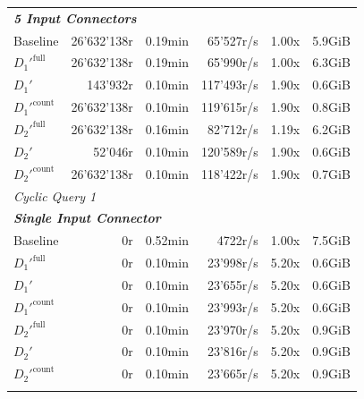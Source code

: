\begin{longtable}{lrrrrr}
    \multicolumn{6}{l}{\textit{\textbf{5 Input Connectors}}} \\
    \nopagebreak
    Baseline              &  26'632'138r          &  0.19min        &  65'527r/s           & 1.00x             & 5.9GiB    \\
    $D_1'^{\text{full}}$   &  26'632'138r          &  0.19min        &  65'990r/s           & 1.00x             & 6.3GiB    \\
    \quad $D_1'$           &  143'932r             &  0.10min        &  117'493r/s          & 1.90x             & 0.6GiB    \\
    $D_1'^{\text{count}}$  &  26'632'138r          &  0.10min        &  119'615r/s          & 1.90x             & 0.8GiB    \\
    $D_2'^{\text{full}}$   &  26'632'138r          &  0.16min        &  82'712r/s           & 1.19x             & 6.2GiB    \\
    \quad $D_2'$           &  52'046r              &  0.10min        &  120'589r/s          & 1.90x             & 0.6GiB    \\
    $D_2'^{\text{count}}$  &  26'632'138r          &  0.10min        &  118'422r/s          & 1.90x             & 0.7GiB    \\
    \midrule

    \multicolumn{6}{l}{\textit{Cyclic Query 1}} \\
    \midrule
    \multicolumn{6}{l}{\textit{\textbf{Single Input Connector}}} \\
    \nopagebreak
    Baseline              &  0r                   &  0.52min        &  4722r/s             & 1.00x             & 7.5GiB    \\
    $D_1'^{\text{full}}$   &  0r                   &  0.10min        &  23'998r/s           & 5.20x             & 0.6GiB    \\
    \quad $D_1'$           &  0r                   &  0.10min        &  23'655r/s           & 5.20x             & 0.6GiB    \\
    $D_1'^{\text{count}}$  &  0r                   &  0.10min        &  23'993r/s           & 5.20x             & 0.6GiB    \\
    $D_2'^{\text{full}}$   &  0r                   &  0.10min        &  23'970r/s           & 5.20x             & 0.9GiB    \\
    \quad $D_2'$           &  0r                   &  0.10min        &  23'816r/s           & 5.20x             & 0.9GiB    \\
    $D_2'^{\text{count}}$  &  0r                   &  0.10min        &  23'665r/s           & 5.20x             & 0.9GiB    \\
    \addlinespace


\end{longtable}
